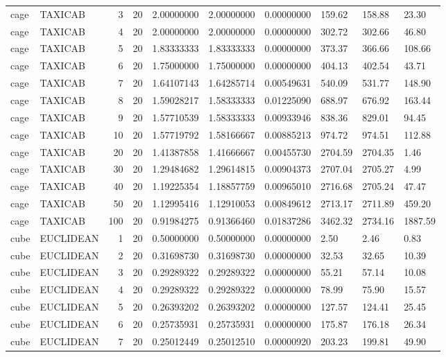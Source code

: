 \begin{longtable}{llrrllllll}
cage & TAXICAB & 3 & 20 & 2.00000000 & 2.00000000 & 0.00000000 & 159.62 & 158.88 & 23.30 \\
cage & TAXICAB & 4 & 20 & 2.00000000 & 2.00000000 & 0.00000000 & 302.72 & 302.66 & 46.80 \\
cage & TAXICAB & 5 & 20 & 1.83333333 & 1.83333333 & 0.00000000 & 373.37 & 366.66 & 108.66 \\
cage & TAXICAB & 6 & 20 & 1.75000000 & 1.75000000 & 0.00000000 & 404.13 & 402.54 & 43.71 \\
cage & TAXICAB & 7 & 20 & 1.64107143 & 1.64285714 & 0.00549631 & 540.09 & 531.77 & 148.90 \\
cage & TAXICAB & 8 & 20 & 1.59028217 & 1.58333333 & 0.01225090 & 688.97 & 676.92 & 163.44 \\
cage & TAXICAB & 9 & 20 & 1.57710539 & 1.58333333 & 0.00933946 & 838.36 & 829.01 & 94.45 \\
cage & TAXICAB & 10 & 20 & 1.57719792 & 1.58166667 & 0.00885213 & 974.72 & 974.51 & 112.88 \\
cage & TAXICAB & 20 & 20 & 1.41387858 & 1.41666667 & 0.00455730 & 2704.59 & 2704.35 & 1.46 \\
cage & TAXICAB & 30 & 20 & 1.29484682 & 1.29614815 & 0.00904373 & 2707.04 & 2705.27 & 4.99 \\
cage & TAXICAB & 40 & 20 & 1.19225354 & 1.18857759 & 0.00965010 & 2716.68 & 2705.24 & 47.47 \\
cage & TAXICAB & 50 & 20 & 1.12995416 & 1.12910053 & 0.00849612 & 2713.17 & 2711.89 & 459.20 \\
cage & TAXICAB & 100 & 20 & 0.91984275 & 0.91366460 & 0.01837286 & 3462.32 & 2734.16 & 1887.59 \\
cube & EUCLIDEAN & 1 & 20 & 0.50000000 & 0.50000000 & 0.00000000 & 2.50 & 2.46 & 0.83 \\
cube & EUCLIDEAN & 2 & 20 & 0.31698730 & 0.31698730 & 0.00000000 & 32.53 & 32.65 & 10.39 \\
cube & EUCLIDEAN & 3 & 20 & 0.29289322 & 0.29289322 & 0.00000000 & 55.21 & 57.14 & 10.08 \\
cube & EUCLIDEAN & 4 & 20 & 0.29289322 & 0.29289322 & 0.00000000 & 78.99 & 75.90 & 15.57 \\
cube & EUCLIDEAN & 5 & 20 & 0.26393202 & 0.26393202 & 0.00000000 & 127.57 & 124.41 & 25.45 \\
cube & EUCLIDEAN & 6 & 20 & 0.25735931 & 0.25735931 & 0.00000000 & 175.87 & 176.18 & 26.34 \\
cube & EUCLIDEAN & 7 & 20 & 0.25012449 & 0.25012510 & 0.00000920 & 203.23 & 199.81 & 49.90 \\

\end{longtable}
